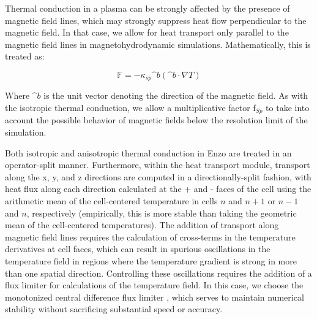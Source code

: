 Thermal conduction in a
plasma can be strongly affected by the presence of magnetic field
lines, which may strongly suppress heat flow perpendicular to the
magnetic field.  In that case, we allow for heat transport only
parallel to
the magnetic field lines in magnetohydrodynamic simulations.
Mathematically, this is treated as:

\begin{equation}
\mathbb{F} = -\kappa_{sp} \^{b} (\^{b} \cdot \nabla T)
\end{equation}

Where $\^{b}$ is the unit vector denoting the direction of the
magnetic field.  As with the isotropic thermal conduction, we allow a
multiplicative factor f$_{Sp}$ to take into account the possible
behavior of magnetic fields below the resolution limit of the
simulation.

Both isotropic and anisotropic thermal conduction in Enzo are treated
in an operator-split manner.  Furthermore, within the heat transport
module, transport along the x, y, and z directions are computed in a
directionally-split fashion, with heat flux along each direction
calculated at the + and - faces of the cell using the arithmetic mean
of the cell-centered temperature in cells $n$ and $n+1$ or $n-1$ and
$n$, respectively (empirically, this is more stable than taking the
geometric mean of the cell-centered temperatures).  The addition of
transport along magnetic field lines requires the calculation of
cross-terms in the temperature derivatives at cell faces, which can
result in spurious oscillations in the temperature field in regions
where the temperature gradient is strong in more than one spatial
direction.  Controlling these oscillations requires the addition of a
flux limiter for calculations of the temperature field.  In this case,
we choose the monotonized central difference flux limiter \citep{1977JCoPh..23..263V}, which serves to maintain numerical stability without
sacrificing substantial speed or accuracy.
